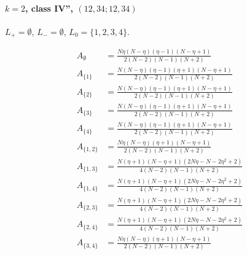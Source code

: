 \documentclass[11pt]{article}
\begin{document}
\paragraph{$k=2$, class IV'', $(12,34;12,34)$}

$L_+=\emptyset$, $L_-=\emptyset$, $L_0=\{1,2,3,4\}$.

\begin{align*}
  A_{\emptyset} &= \frac{N \eta \left(N - \eta\right) \left(\eta - 1\right) \left(N - \eta + 1\right)}{2 \left(N - 2\right) \left(N - 1\right) \left(N + 2\right)} \\
  A_{\{1\}} &= \frac{N \left(N - \eta\right) \left(\eta - 1\right) \left(\eta + 1\right) \left(N - \eta + 1\right)}{2 \left(N - 2\right) \left(N - 1\right) \left(N + 2\right)} \\
  A_{\{2\}} &= \frac{N \left(N - \eta\right) \left(\eta - 1\right) \left(\eta + 1\right) \left(N - \eta + 1\right)}{2 \left(N - 2\right) \left(N - 1\right) \left(N + 2\right)} \\
  A_{\{3\}} &= \frac{N \left(N - \eta\right) \left(\eta - 1\right) \left(\eta + 1\right) \left(N - \eta + 1\right)}{2 \left(N - 2\right) \left(N - 1\right) \left(N + 2\right)} \\
  A_{\{4\}} &= \frac{N \left(N - \eta\right) \left(\eta - 1\right) \left(\eta + 1\right) \left(N - \eta + 1\right)}{2 \left(N - 2\right) \left(N - 1\right) \left(N + 2\right)} \\
  A_{\{1,2\}} &= \frac{N \eta \left(N - \eta\right) \left(\eta + 1\right) \left(N - \eta + 1\right)}{2 \left(N - 2\right) \left(N - 1\right) \left(N + 2\right)} \\
  A_{\{1,3\}} &= \frac{N \left(\eta + 1\right) \left(N - \eta + 1\right) \left(2 N \eta - N - 2 \eta^{2} + 2\right)}{4 \left(N - 2\right) \left(N - 1\right) \left(N + 2\right)} \\
  A_{\{1,4\}} &= \frac{N \left(\eta + 1\right) \left(N - \eta + 1\right) \left(2 N \eta - N - 2 \eta^{2} + 2\right)}{4 \left(N - 2\right) \left(N - 1\right) \left(N + 2\right)} \\
  A_{\{2,3\}} &= \frac{N \left(\eta + 1\right) \left(N - \eta + 1\right) \left(2 N \eta - N - 2 \eta^{2} + 2\right)}{4 \left(N - 2\right) \left(N - 1\right) \left(N + 2\right)} \\
  A_{\{2,4\}} &= \frac{N \left(\eta + 1\right) \left(N - \eta + 1\right) \left(2 N \eta - N - 2 \eta^{2} + 2\right)}{4 \left(N - 2\right) \left(N - 1\right) \left(N + 2\right)} \\
  A_{\{3,4\}} &= \frac{N \eta \left(N - \eta\right) \left(\eta + 1\right) \left(N - \eta + 1\right)}{2 \left(N - 2\right) \left(N - 1\right) \left(N + 2\right)} \\

\end{align*}
\end{document}
